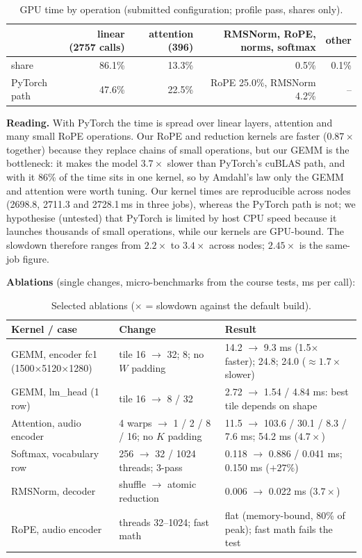\documentclass{article}
\begin{document}
\begin{table}[h]
\centering\small
\caption{GPU time by operation (submitted configuration; profile pass, shares only).}
\label{tab:profile}
\begin{tabular}{lrrrr}
\toprule
 & linear (2757 calls) & attention (396) & RMSNorm, RoPE, norms, softmax & other\\
\midrule
share & 86.1\% & 13.3\% & 0.5\% & 0.1\%\\
PyTorch path & 47.6\% & 22.5\% & RoPE 25.0\%, RMSNorm 4.2\% & --\\
\bottomrule
\end{tabular}
\end{table}

\textbf{Reading.} With PyTorch the time is spread over linear layers, attention and many small RoPE operations. Our RoPE and reduction kernels are faster ($0.87\times$ together) because they replace chains of small operations, but our GEMM is the bottleneck: it makes the model $3.7\times$ slower than PyTorch's cuBLAS path, and with it 86\% of the time sits in one kernel, so by Amdahl's law \citep{amdahl1967validity} only the GEMM and attention were worth tuning. Our kernel times are reproducible across nodes (2698.8, 2711.3 and 2728.1\,ms in three jobs), whereas the PyTorch path is not; we hypothesise (untested) that PyTorch is limited by host CPU speed because it launches thousands of small operations, while our kernels are GPU-bound. The slowdown therefore ranges from $2.2\times$ to $3.4\times$ across nodes; $2.45\times$ is the same-job figure.

\textbf{Ablations} (single changes, micro-benchmarks from the course tests, ms per call):

\begin{table}[h]
\centering\small
\caption{Selected ablations ($\times$ = slowdown against the default build).}
\label{tab:ablate}
\begin{tabular}{p{3.0cm}p{3.1cm}p{5.2cm}}
\toprule
Kernel / case & Change & Result\\
\midrule
GEMM, encoder fc1 (1500$\times$5120$\times$1280) & tile 16 $\to$ 32; 8; no $W$ padding & 14.2 $\to$ 9.3 ms (1.5$\times$ faster); 24.8; 24.0 ($\approx 1.7\times$ slower)\\
GEMM, lm\_head (1 row) & tile 16 $\to$ 8 / 32 & 2.72 $\to$ 1.54 / 4.84 ms: best tile depends on shape\\
Attention, audio encoder & 4 warps $\to$ 1 / 2 / 8 / 16; no $K$ padding & 11.5 $\to$ 103.6 / 30.1 / 8.3 / 7.6 ms; 54.2 ms ($4.7\times$)\\
Softmax, vocabulary row & 256 $\to$ 32 / 1024 threads; 3-pass & 0.118 $\to$ 0.886 / 0.041 ms; 0.150 ms ($+27\%$)\\
RMSNorm, decoder & shuffle $\to$ atomic reduction & 0.006 $\to$ 0.022 ms ($3.7\times$)\\
RoPE, audio encoder & threads 32--1024; fast math & flat (memory-bound, 80\% of peak); fast math fails the test\\
\bottomrule
\end{tabular}
\end{table}
\end{document}

